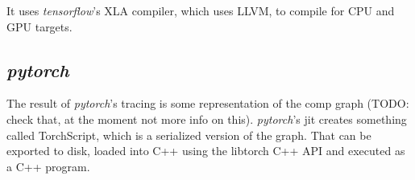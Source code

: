 \documentclass[paper=a4,11pt,headsepline]{scrartcl}
\newcommand{\soft}[1]{\textsl{#1}\xspace}
\newcommand{\pytorch}{\soft{pytorch}}
\newcommand{\tf}{\soft{tensorflow}}
\begin{document}
It uses \tf's XLA compiler, which uses LLVM, to compile for CPU and GPU targets.

\subsection{\pytorch}

The result of \pytorch's tracing is some representation of the comp graph
(TODO: check that, at the moment not more info on this). \pytorch's jit creates
something called TorchScript, which is a serialized version of the graph. That
can be exported to disk, loaded into C++ using the libtorch C++ API and
executed as a C++ program.

\nocite{*}
\printbibliography
\end{document}
